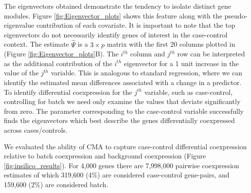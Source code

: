 The eigenvectors obtained demonstrate the tendency to isolate distinct
gene modules. Figure \ref{fig:Eigenvector_plots} shows this feature
along with the pseudo-eigenvalue contribution of each covariate. It
is important to note that the top eigenvectors do not necessarily
identify genes of interest in the case-control context. The estimate
$\hat{\Psi}$ is a $3\times p$ matrix with the first 20 columns plotted
in (Figure \ref{fig:Eigenvector_plots}B). The $i^{th}$ column and
$j^{th}$ row can be interpreted as the additional contribution of
the $i^{th}$ eigenvector for a 1 unit increase in the value of the
$j^{th}$ variable. This is analogous to standard regression, where
we can identify the estimated mean differences associated with a change
in a predictor. To identify differential coexpression for the $j^{th}$
variable, such as case-control, controlling for batch we need only
examine the values that deviate significantly from zero. The parameter
corresponding to the case-control variable successfully finds the
eigenvectors which best describe the genes differentially coexpressed
across cases/controls.

We evaluated the ability of CMA to capture case-control differential
coexpression relative to batch coexpression and background coexpression
(Figure \ref{fig:insilico_results}). For 4,000 genes there are 7,998,000
pairwise coexpression estimates of which 319,600 (4\%) are considered
case-control gene-pairs, and 159,600 (2\%) are considered batch.

